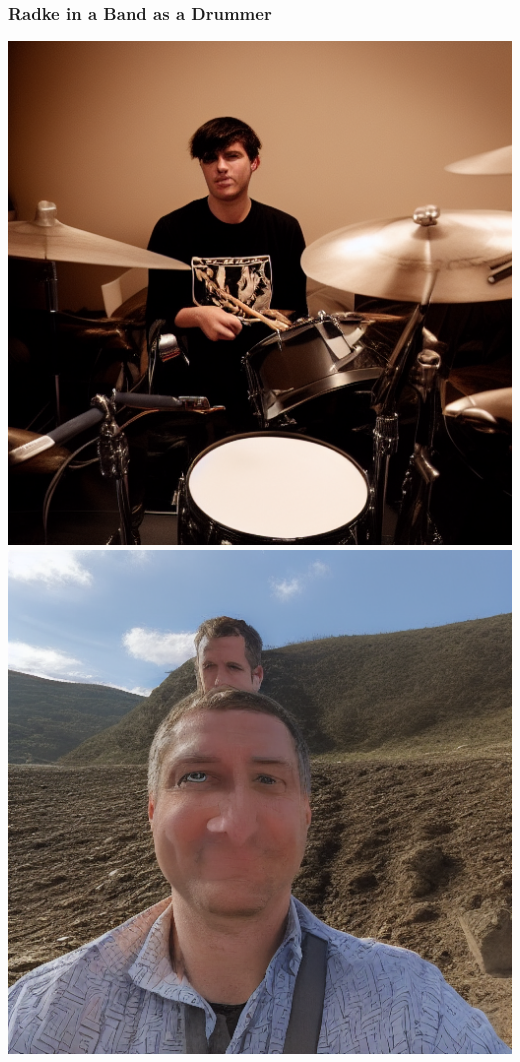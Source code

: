 \documentclass{article}
\begin{document}
\subsubsection{Radke in a Band as a Drummer}
\begin{center}
    \includegraphics[scale=0.3]{.imgs/drummer_base.png}
    \includegraphics[scale=0.3]{.imgs/radke_lora_v1.5_(2)_prompting_drummer_1.png} \\

\end{center}
\end{document}
